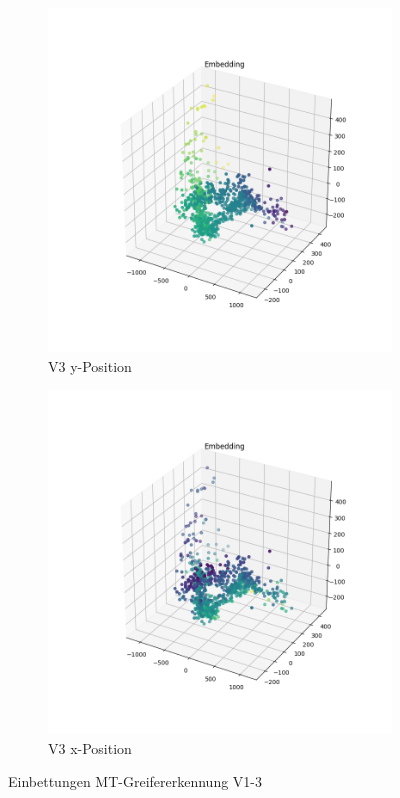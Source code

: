 \begin{figure}[h]
	\begin{subfigure}[c]{0.49\textwidth}			
		\includegraphics[width=1\textwidth,center]{bilder/Hauptteil/MT_Grapple/EMB_alle/3_Embedding_y.png}
		\caption{V3 y-Position}
		\label{img:Einbettung3_y}	
	\end{subfigure}
	\centering
	\begin{subfigure}[c]{0.49\textwidth}			
		\includegraphics[width=1\textwidth,center]{bilder/Hauptteil/MT_Grapple/EMB_alle/3_Embedding_x.png}
		\caption{V3 x-Position}
		\label{img:Einbettung3_x}		
	\end{subfigure}
	
	\caption{Einbettungen MT-Greifererkennung V1-3}
	\label{img:Einbettungen1-3}
\end{figure}